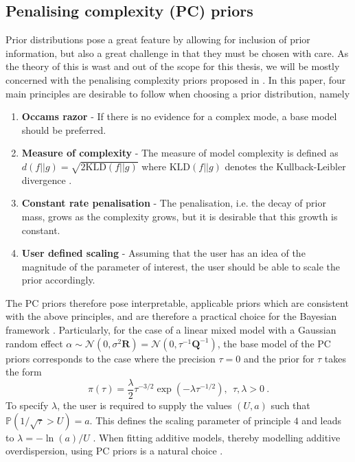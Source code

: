 \subsection{Penalising complexity (PC) priors}
\label{seq:PC_prior}
Prior distributions pose a great feature by allowing for inclusion of prior information, but also a great challenge in that they must be chosen with care.
As the theory of this is wast and out of the scope for this thesis, we will be mostly concerned with the penalising complexity priors proposed in \citet{simpson2017penalising}.
In this paper, four main principles are desirable to follow when choosing a prior distribution, namely 
\begin{enumerate}
    \item \textbf{Occams razor} - If there is no evidence for a complex mode, a base model should be preferred. 
    \item \textbf{Measure of complexity} - The measure of model complexity is defined as $d(f \lvert \lvert g) = \sqrt{2 \text{KLD}(f \lvert \lvert g)}$ where $\text{KLD}(f \lvert \lvert g)$ denotes the Kullback-Leibler divergence \citep[for more information]{simpson2017penalising}.
    \item \textbf{Constant rate penalisation} - The penalisation, i.e. the decay of prior mass, grows as the complexity grows, but it is desirable that this growth is constant.
    \item \textbf{User defined scaling} - Assuming that the user has an idea of the magnitude of the parameter of interest, the user should be able to scale the prior accordingly.
\end{enumerate}
The PC priors therefore pose interpretable, applicable priors which are consistent with the above principles, and are therefore a practical choice for the Bayesian framework \citep{simpson2017penalising}. 
Particularly, for the case of a linear mixed model with a Gaussian random effect $\alpha \sim \mathcal{N}(0, \sigma^2 \mathbf{R}) = \mathcal{N}(0, \tau^{-1} \mathbf{Q}^{-1})$, the base model of the PC priors corresponds to the case where the precision $\tau=0$ and the prior for $\tau$ takes the form
\begin{equation}
    \label{eq:PC_prior}
    \pi(\tau) = \frac{\lambda}{2} \tau^{-3/2} \exp\left(-\lambda \tau^{-1/2}\right), \ \   \tau, \lambda>0 \ .
\end{equation}
To specify $\lambda$, the user is required to supply the values $(U, a)$ such that $\mathbb{P}(1/\sqrt{\tau} > U) = a$. 
This defines the scaling parameter of principle $4$ and leads to $\lambda=-\ln(a)/U$ \citep{simpson2017penalising}.
When fitting additive models, thereby modelling additive overdispersion, using PC priors is a natural choice \citep{gomezrubio2020inla}.

